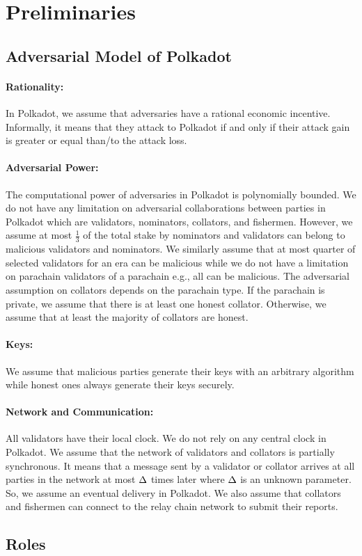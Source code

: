 \section{Preliminaries}

\subsection{Adversarial Model of Polkadot}

\paragraph{Rationality:} In Polkadot, we assume that adversaries have a rational economic incentive. Informally, it means that they attack to Polkadot if and only if their attack gain is greater or equal than/to the attack loss. 

\paragraph{Adversarial Power:} The computational power of adversaries in Polkadot is polynomially bounded.  We do not have any limitation on adversarial collaborations between parties in Polkadot which are validators, nominators, collators, and fishermen. However, we assume at most $\frac{1}{3}$ of the total stake by nominators and validators can belong to malicious validators and nominators. 
We similarly assume that at most quarter of selected validators for an era can be malicious while we do not have a limitation on parachain validators of a parachain e.g., all can be malicious.  
The adversarial assumption on collators depends on the parachain type. If the parachain is private, we assume that there is at least one honest collator. Otherwise, we assume that at least the majority of collators are honest.

\paragraph{Keys:} We assume that malicious parties generate their keys with an arbitrary algorithm while honest ones always generate their keys securely.

\paragraph{Network and Communication:} All validators have their local clock. We do not rely on any central clock in Polkadot. We assume that the network of validators and collators is partially synchronous. It means that a message sent by a validator or collator arrives at all parties in the network at most $\Delta$ times later where $\Delta$ is an unknown parameter. So, we assume an eventual delivery in Polkadot.
We also assume that collators and fishermen can connect to the relay chain network to submit their reports.

\subsection{Roles}

